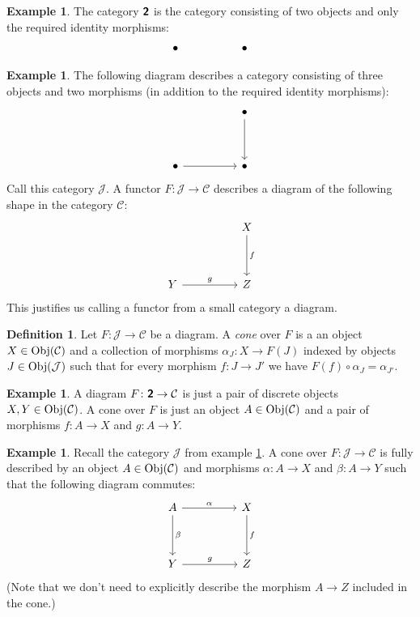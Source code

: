 \documentclass[12pt]{article}
\theoremstyle{definition}
\newtheorem{dfn}[thm]{Definition}
\newtheorem{exm}[thm]{Example}
\theoremstyle{remark}
\newcommand{\catvar}[1]{\mathcal{#1}}
\newcommand{\CC}{\catvar{C}}
\newcommand{\JJ}{\catvar{J}}
\newcommand{\catname}[1]{\textup{\sffamily\textbf{#1}}}
\newcommand{\Obj}[1]{\textup{Obj}(#1)}
\begin{document}
    \begin{exm}
        The category $\catname{2}$ is the category consisting of two objects and only the required identity morphisms:
            \[\begin{tikzcd}
                \bullet && \bullet
            \end{tikzcd}\]
    \end{exm}

    \begin{exm}\label{exm:pod}
        The following diagram describes a category consisting of three objects and two morphisms (in addition to the required identity morphisms):
        \[\begin{tikzcd}
            && \bullet \\
            \\
            \bullet && \bullet
            \arrow[from=1-3, to=3-3]
            \arrow[from=3-1, to=3-3]
        \end{tikzcd}\]
        Call this category $\catvar{J}$. A functor $F\colon \JJ\to\CC$ describes a diagram of the following shape in the category $\CC$:
        \[\begin{tikzcd}
            && X \\
            \\
            Y && Z
            \arrow["f", from=1-3, to=3-3]
            \arrow["g", from=3-1, to=3-3]
        \end{tikzcd}\]
        This justifies us calling a functor from a small category a diagram.
    \end{exm}

    \begin{dfn}
        Let $F\colon\JJ\to\CC$ be a diagram. A \emph{cone} over $F$ is a an object $X\in\Obj{\CC}$ and a collection of morphisms $\alpha_J\colon X\to F(J)$ indexed by objects $J\in\Obj{\JJ}$ such that for every morphism $f\colon J\to J'$ we have $F(f)\circ \alpha_{J}=\alpha_{J'}$.
    \end{dfn}

    \begin{exm}
        A diagram $F\colon\catname{2}\to\CC$ is just a pair of discrete objects $X,Y\in\Obj{\CC}$. A cone over $F$ is just an object $A\in\Obj{\CC}$ and a pair of morphisms $f\colon A\to X$ and $g\colon A\to Y$.
    \end{exm}
    
    \begin{exm}
        Recall the category $\JJ$ from example \ref{exm:pod}. A cone over $F:\JJ\to\CC$ is fully described by an object $A\in\Obj{\CC}$ and morphisms $\alpha\colon A\to X$ and $\beta\colon A\to Y$ such that the following diagram commutes:
        \[\begin{tikzcd}
            A && X \\
            \\
            Y && Z
            \arrow["\alpha", from=1-1, to=1-3]
            \arrow["\beta", from=1-1, to=3-1]
            \arrow["f", from=1-3, to=3-3]
            \arrow["g", from=3-1, to=3-3]
        \end{tikzcd}\]
        (Note that we don't need to explicitly describe the morphism $A\to Z$ included in the cone.)
    \end{exm}
\end{document}
